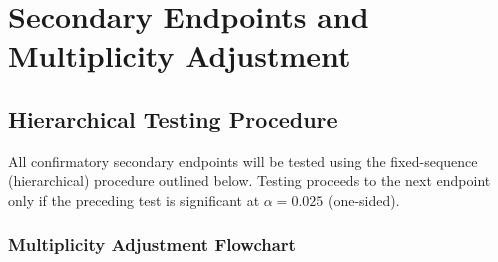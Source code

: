 \section{Secondary Endpoints and Multiplicity Adjustment}

\subsection{Hierarchical Testing Procedure}

All confirmatory secondary endpoints will be tested using the fixed-sequence (hierarchical)
procedure outlined below. Testing proceeds to the next endpoint only if the preceding
test is significant at $\alpha = 0.025$ (one-sided).

\subsubsection{Multiplicity Adjustment Flowchart}

